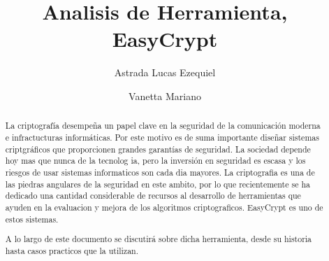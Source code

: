 \documentclass[runningheads,a4paper]{llncs}
\begin{document}
\mainmatter  %

\title{Analisis de Herramienta, EasyCrypt}


%
%
\author{Astrada Lucas Ezequiel
\and Vanetta Mariano}
%


%
%

\maketitle


\begin{abstract}
La criptografía desempeña un papel clave en la seguridad de la comunicación moderna e infractucturas informáticas.  Por este motivo es de suma importante diseñar sistemas criptgráficos que proporcionen grandes garantías de seguridad.
La sociedad depende hoy mas que nunca de la tecnolog ia, pero la inversión en seguridad es escasa y los riesgos de usar sistemas informaticos son cada dia mayores. La criptografia es una de las piedras angulares de la seguridad en este  ambito, por lo que recientemente se ha dedicado una cantidad considerable de recursos al desarrollo de herramientas que ayuden en la evaluacion y mejora de los algoritmos criptograficos. EasyCrypt es uno de estos sistemas. 

    A lo largo de este documento se discutirá sobre dicha herramienta, desde su historia hasta casos practicos que la utilizan.

\end{abstract}
\end{document}
